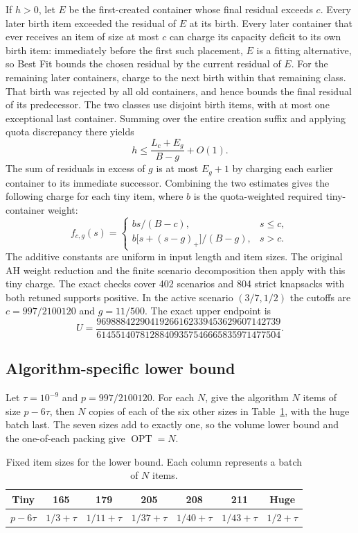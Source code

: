 \documentclass[11pt,letterpaper]{article}
\theoremstyle{definition}
\theoremstyle{remark}
\newcommand{\OPT}{\operatorname{OPT}}
\begin{document}
If $h>0$, let $E$ be the first-created container whose final residual exceeds $c$. Every later birth item exceeded the residual of $E$ at its birth. Every later container that ever receives an item of size at most $c$ can charge its capacity deficit to its own birth item: immediately before the first such placement, $E$ is a fitting alternative, so Best Fit bounds the chosen residual by the current residual of $E$. For the remaining later containers, charge to the next birth within that remaining class. That birth was rejected by all old containers, and hence bounds the final residual of its predecessor. The two classes use disjoint birth items, with at most one exceptional last container. Summing over the entire creation suffix and applying quota discrepancy there yields
\[
 h\le \frac{L_c+E_g}{B-g}+O(1).
\]
The sum of residuals in excess of $g$ is at most $E_g+1$ by charging each earlier container to its immediate successor. Combining the two estimates gives the following charge for each tiny item, where $b$ is the quota-weighted required tiny-container weight:
\[
 f_{c,g}(s)=
 \begin{cases}
  bs/(B-c),&s\le c,\\
  b\bigl[s+(s-g)_+\bigr]/(B-g),&s>c.
 \end{cases}
\]
The additive constants are uniform in input length and item sizes. The original AH weight reduction and the finite scenario decomposition then apply with this tiny charge. The exact checks cover 402 scenarios and 804 strict knapsacks with both retuned supports positive. In the active scenario $(3/7,1/2)$ the cutoffs are $c=997/2100120$ and $g=11/500$. The exact upper endpoint is
\[
 U=\frac{96988842290419266162339453629607142739}{61455140781288409357546665835971477504}.
\]

\subsection{Algorithm-specific lower bound}
Let $\tau=10^{-9}$ and $p=997/2100120$. For each $N$, give the algorithm $N$ items of size $p-6\tau$, then $N$ copies of each of the six other sizes in Table~\ref{tab:seven-size}, with the huge batch last. The seven sizes add to exactly one, so the volume lower bound and the one-of-each packing give $\OPT=N$.

\begin{table}[!htbp]
\centering\small
\caption{Fixed item sizes for the lower bound. Each column represents a batch of $N$ items.}
\label{tab:seven-size}
\begin{tabular}{@{}ccccccc@{}}
\toprule
Tiny & 165 & 179 & 205 & 208 & 211 & Huge \\
\midrule
$p-6\tau$ & $1/3+\tau$ & $1/11+\tau$ & $1/37+\tau$ & $1/40+\tau$ & $1/43+\tau$ & $1/2+\tau$ \\
\bottomrule
\end{tabular}
\end{table}
\end{document}

